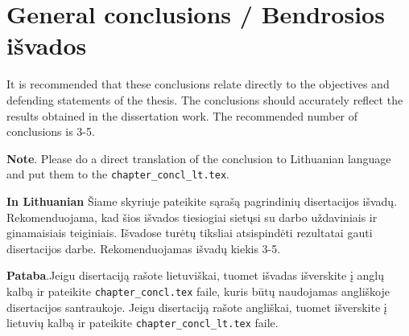 \chapter*{General conclusions / Bendrosios išvados }
\label{cha:concl_lt}

It is recommended that these conclusions relate directly to the objectives and defending statements of the thesis. 
The conclusions should accurately reflect the results obtained in the dissertation work.
The recommended number of conclusions is 3-5.

\textbf{Note}. Please do a direct translation of the conclusion to Lithuanian language and put them to the \verb|chapter_concl_lt.tex|.


\textbf{In Lithuanian} Šiame skyriuje pateikite sąrašą pagrindinių disertacijos išvadų. Rekomenduojama, kad šios išvados tiesiogiai sietųsi su darbo uždaviniais ir ginamaisiais teiginiais. Išvadose turėtų tiksliai atsispindėti rezultatai gauti disertacijos darbe. 
Rekomenduojamas išvadų kiekis 3-5.

\textbf{Pataba}.Jeigu disertaciją rašote lietuviškai, tuomet išvadas išverskite į anglų kalbą ir pateikite \verb|chapter_concl.tex| faile, kuris būtų naudojamas angliškoje disertacijos santraukoje.
Jeigu disertaciją rašote angliškai, tuomet išverskite į lietuvių kalbą ir pateikite \verb|chapter_concl_lt.tex| faile.